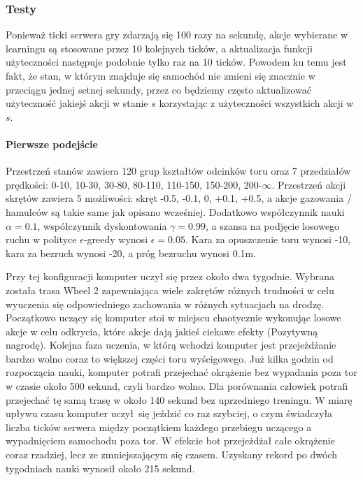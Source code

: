 \documentclass{article}
\begin{document}
\subsubsection{Testy}
Ponieważ ticki serwera gry zdarzają się 100 razy na sekundę, akcje wybierane w learningu są stosowane przez 10 kolejnych ticków, a aktualizacja funkcji użyteczności następuje podobnie tylko raz na 10 ticków. Powodem ku temu jest fakt, że stan, w którym znajduje się samochód nie zmieni się znacznie w przeciągu jednej setnej sekundy, przez co będziemy często aktualizować użyteczność jakiejś akcji w stanie $s$ korzystając z użyteczności wszystkich akcji w $s$.

\paragraph{Pierwsze podejście}

Przestrzeń stanów zawiera 120 grup kształtów odcinków toru oraz 7 przedziałów prędkości: 0-10, 10-30, 30-80, 80-110, 110-150, 150-200, 200-$\infty$. Przestrzeń akcji skrętów zawiera 5 możliwości: skręt -0.5, -0.1, 0, +0.1, +0.5, a akcje gazowania / hamulców są takie same jak opisano wcześniej. Dodatkowo współczynnik nauki $\alpha = 0.1$, współczynnik dyskontowania $\gamma = 0.99$, a szansa na podjęcie losowego ruchu w polityce $\epsilon$-greedy wynosi $\epsilon = 0.05$. Kara za opuszczenie toru wynosi -10, kara za bezruch wynosi -20, a próg bezruchu wynosi 0.1m.

Przy tej konfiguracji komputer uczył się przez około dwa tygodnie. Wybrana została trasa Wheel 2 zapewniająca wiele zakrętów różnych trudności w celu wyuczenia się odpowiedniego zachowania w różnych sytuacjach na drodzę. Początkowo uczący się komputer stoi w miejscu chaotycznie wykonując losowe akcje w celu odkrycia, które akcje dają jakieś ciekawe efekty (Pozytywną nagrodę). Kolejna faza uczenia, w którą wchodzi komputer jest przejeżdżanie bardzo wolno coraz to większej części toru wyścigowego. Już kilka godzin od rozpoczącia nauki, komputer potrafi przejechać okrążenie bez wypadania poza tor w czasie około 500 sekund, czyli bardzo wolno. Dla porównania człowiek potrafi przejechać tę samą trasę w około 140 sekund bez uprzedniego treningu. W miarę upływu czasu komputer uczył się jeździć co raz szybciej, o czym świadczyła liczba ticków serwera między początkiem każdego przebiegu uczącego a wypadnięciem samochodu poza tor. W efekcie bot przejeżdżał całe okrążenie coraz rzadziej, lecz ze zmniejszającym się czasem. Uzyskany rekord po dwóch tygodniach nauki wynosił około 215 sekund.
\end{document}
